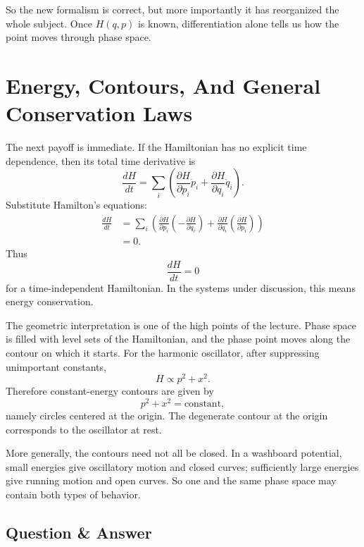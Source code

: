 So the new formalism is correct, but more importantly it has reorganized the whole subject. Once \(H(q,p)\) is known, differentiation alone tells us how the point moves through phase space.

\section{Energy, Contours, And General Conservation Laws}

The next payoff is immediate. If the Hamiltonian has no explicit time dependence, then its total time derivative is
\begin{equation}
\frac{dH}{dt}
=
\sum_i
\left(
\frac{\partial H}{\partial p_i}\dot p_i
+
\frac{\partial H}{\partial q_i}\dot q_i
\right).
\end{equation}
Substitute Hamilton's equations:
\begin{align}
\frac{dH}{dt}
&=
\sum_i
\left(
\frac{\partial H}{\partial p_i}
\left(-\frac{\partial H}{\partial q_i}\right)
+
\frac{\partial H}{\partial q_i}
\left(\frac{\partial H}{\partial p_i}\right)
\right) \\
&=0 .
\end{align}
Thus
\begin{equation}
\frac{dH}{dt}=0
\end{equation}
for a time-independent Hamiltonian. In the systems under discussion, this means energy conservation.

The geometric interpretation is one of the high points of the lecture. Phase space is filled with level sets of the Hamiltonian, and the phase point moves along the contour on which it starts. For the harmonic oscillator, after suppressing unimportant constants,
\begin{equation}
H \propto p^2+x^2.
\end{equation}
Therefore constant-energy contours are given by
\begin{equation}
p^2+x^2=\text{constant},
\end{equation}
namely circles centered at the origin. The degenerate contour at the origin corresponds to the oscillator at rest.

More generally, the contours need not all be closed. In a washboard potential, small energies give oscillatory motion and closed curves; sufficiently large energies give running motion and open curves. So one and the same phase space may contain both types of behavior.

\subsection{Question \& Answer}

